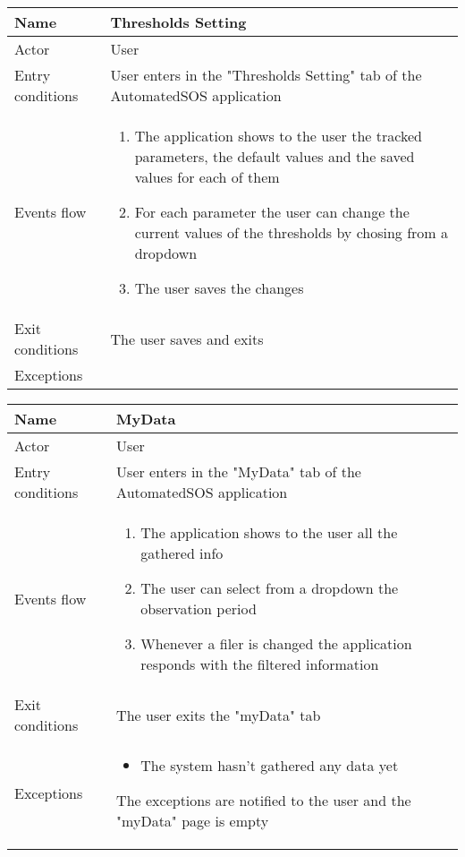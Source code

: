 \begin{table}[h!]
    \begin{tabular}{|l|p{12cm}|}
        \hline
        Name             & Thresholds Setting \\ \hline
        Actor            & User \\ \hline
        Entry conditions & User enters in the "Thresholds Setting" tab of the AutomatedSOS application \\ \hline
        Events flow      & 
        \begin{enumerate}
            \item The application shows to the user the tracked parameters, the default values and the saved values for each of them
            \item For each parameter the user can change the current values of the thresholds by chosing from a dropdown
            \item The user saves the changes
        \end{enumerate} \\ \hline
        Exit conditions  & The user saves and exits \\ \hline
        Exceptions       &  \\ \hline
    \end{tabular}
\end{table}

\newpage

\begin{table}[h!]
    \begin{tabular}{|l|p{12cm}|}
        \hline
        Name             & MyData \\ \hline
        Actor            & User \\ \hline
        Entry conditions & User enters in the "MyData" tab of the AutomatedSOS application \\ \hline
        Events flow      & 
        \begin{enumerate}
            \item The application shows to the user all the gathered info
            \item The user can select from a dropdown the observation period
            \item Whenever a filer is changed the application responds with the filtered information
        \end{enumerate} \\ \hline
        Exit conditions  & The user exits the "myData" tab \\ \hline
        Exceptions       & 
        \begin{itemize}
            \item The system hasn't gathered any data yet
        \end{itemize} The exceptions are notified to the user and the "myData" page is empty \\ \hline
    \end{tabular}
\end{table}

